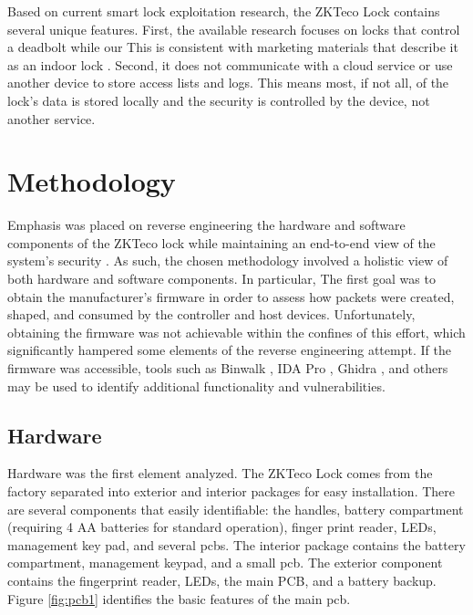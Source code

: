 \documentclass[conference]{IEEEtran}
\begin{document}
\bigskip

Based on current smart lock exploitation research, the ZKTeco Lock contains several unique features. First, the available research focuses on locks that control a deadbolt while our  This is consistent with marketing materials that describe it as an indoor lock \cite{ZKTeco}. Second, it does not communicate with a cloud service or use another device to store access lists and logs. This means most, if not all, of the lock's data is stored locally and the security is controlled by the device, not another service.

\section{Methodology}

Emphasis was placed on reverse engineering the hardware and software components of the ZKTeco lock while maintaining an end-to-end view of the system's security \cite{Ling2018}.  As such, the chosen methodology involved a holistic view of both hardware and software components.  In particular, The first goal was to obtain the manufacturer's firmware in order to assess how packets were created, shaped, and consumed by the controller and host devices.  Unfortunately, obtaining the firmware was not achievable within the confines of this effort, which significantly hampered some elements of the reverse engineering attempt. If the firmware was accessible, tools such as Binwalk \cite{Heffner2019}, IDA Pro \cite{Hex-Rays2019}, Ghidra \cite{NationalSecurityAgency2019}, and others may be used to identify additional functionality and vulnerabilities. 

\subsection{Hardware}

Hardware was the first element analyzed. The ZKTeco Lock comes from the factory separated into exterior and interior packages for easy installation. There are several components that easily identifiable: the handles, battery compartment (requiring 4 AA batteries for standard operation), finger print reader, LEDs, management key pad, and several \gls{pcb}s. The interior package contains the battery compartment, management keypad, and a small \gls{pcb}.  The exterior component contains the fingerprint reader, LEDs, the main PCB, and a battery backup.  Figure \ref{fig:pcb1} identifies the basic features of the main \gls{pcb}.
\end{document}
